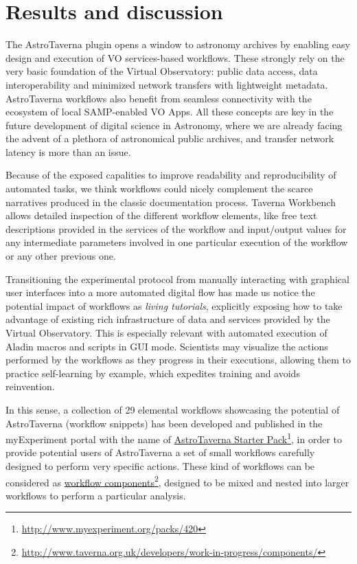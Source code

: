 \documentclass[final,authoryear,5p,times,twocolumn]{elsarticle}
\newcommand{\urlsamefont}[1]{\urlstyle{same}\url{#1}}
\newcommand{\hrefnote}[2]{\href{#1}{#2}\footnote{\urlsamefont{#1}}}
\begin{document}
\section{Results and discussion}
\label{ResultsAndDiscussion}

The AstroTaverna plugin opens a window to astronomy archives by enabling easy design and execution of VO services-based workflows. These strongly rely on the very basic foundation of the Virtual Observatory: public data access, data interoperability and minimized network transfers with lightweight metadata. AstroTaverna workflows also benefit from seamless connectivity with the ecosystem of local SAMP-enabled VO Apps. All these concepts are key in the future development of digital science in Astronomy, where we are already facing the advent of a plethora of astronomical public archives, and transfer network latency is more than an issue. 

Because of the exposed capalities to improve readability and reproducibility of automated tasks, we think workflows could nicely complement the scarce narratives produced in the classic documentation process. Taverna Workbench allows detailed inspection of the different workflow elements, like free text descriptions provided in the services of the workflow and input/output values for any intermediate parameters involved in one particular execution of the workflow or any other previous one.

Transitioning the experimental protocol from manually interacting with graphical user interfaces into a more automated digital flow has made us notice the potential impact of workflows as \textit{living tutorials}, explicitly exposing how to take advantage of existing rich infrastructure of data and services provided by the Virtual Observatory. This is especially relevant with automated execution of Aladin macros and scripts in GUI mode. Scientists may visualize the actions performed by the workflows as they progress in their executions, allowing them to practice self-learning by example, which expedites training and avoids reinvention.  

In this sense, a collection of 29 elemental workflows showcasing the potential of AstroTaverna (workflow snippets) has been developed and published in the myExperiment portal with the name of \hrefnote{http://www.myexperiment.org/packs/420}{\label{starterpack}AstroTaverna Starter Pack}, in order to provide potential users of AstroTaverna a set of small workflows carefully designed to perform very specific actions. These kind of workflows can be considered as \hrefnote{http://www.taverna.org.uk/developers/work-in-progress/components/}{workflow components}, designed to be mixed and nested into larger workflows to perform a particular analysis. 
\end{document}
